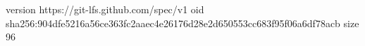 version https://git-lfs.github.com/spec/v1
oid sha256:904dfe5216a56ce363fc2aaec4e26176d28e2d650553cc683f95f06a6df78acb
size 96

